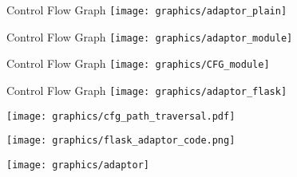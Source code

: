 \begin{frame}
\end{frame}

\begin{frame}{Control Flow Graph}
  \texttt{[image: graphics/adaptor\_plain]}
\end{frame}

\begin{frame}{Control Flow Graph}
  \texttt{[image: graphics/adaptor\_module]}
\end{frame}


\begin{frame}{Control Flow Graph}
    \center
    \texttt{[image: graphics/CFG\_module]}
\end{frame}

\begin{frame}
\end{frame}

\begin{frame}{Control Flow Graph}
  \texttt{[image: graphics/adaptor\_flask]}
\end{frame}


\begin{frame}[plain]
  \center
  \texttt{[image: graphics/cfg\_path\_traversal.pdf]}
\end{frame}


\begin{frame}[plain]
  \center
  \texttt{[image: graphics/flask\_adaptor\_code.png]}
\end{frame}


\begin{frame}
  \center
  \texttt{[image: graphics/adaptor]}
\end{frame}
